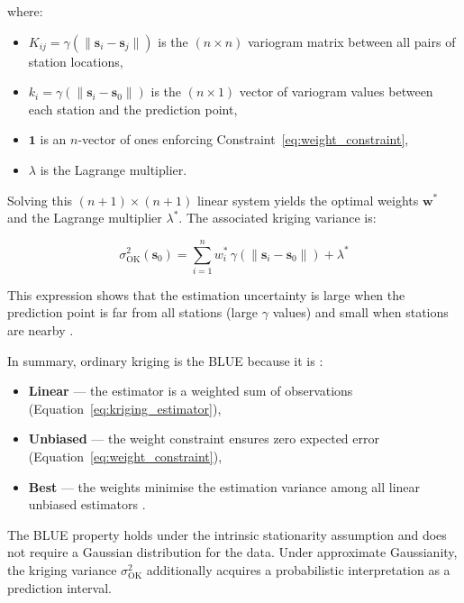 \noindent where:
\begin{itemize}
    \item $K_{ij} = \gamma(\|\mathbf{s}_i - \mathbf{s}_j\|)$ is the
    $(n \times n)$ variogram matrix between all pairs of station locations,
    \item $k_i = \gamma(\|\mathbf{s}_i - \mathbf{s}_0\|)$ is the
    $(n \times 1)$ vector of variogram values between each station and
    the prediction point,
    \item $\mathbf{1}$ is an $n$-vector of ones enforcing
    Constraint~\eqref{eq:weight_constraint},
    \item $\lambda$ is the Lagrange multiplier.
\end{itemize}

Solving this $(n+1) \times (n+1)$ linear system yields the optimal weights
$\mathbf{w}^*$ and the Lagrange multiplier $\lambda^*$.
The associated kriging variance is:

\begin{equation}
    \sigma^2_{\text{OK}}(\mathbf{s}_0)
    = \sum_{i=1}^{n} w_i^* \, \gamma(\|\mathbf{s}_i - \mathbf{s}_0\|)
    + \lambda^*
    \label{eq:kriging_variance}
\end{equation}

\noindent This expression shows that the estimation uncertainty is large when
the prediction point is far from all stations (large $\gamma$ values) and
small when stations are nearby \cite{cressie1993}.

In summary, ordinary kriging is the BLUE because it is
\cite{matheron1963principles, cressie1993, webster2007geostatistics}:
\begin{itemize}
    \item \textbf{Linear} — the estimator is a weighted sum of observations
    (Equation~\eqref{eq:kriging_estimator}),
    \item \textbf{Unbiased} — the weight constraint ensures zero expected error
    (Equation~\eqref{eq:weight_constraint}),
    \item \textbf{Best} — the weights minimise the estimation variance among
    all linear unbiased estimators
    \cite{matheron1963principles, cressie1993}.
\end{itemize}

\noindent The BLUE property holds under the intrinsic stationarity assumption
and does not require a Gaussian distribution for the data.
Under approximate Gaussianity, the kriging variance
$\sigma^2_{\text{OK}}$ additionally acquires a probabilistic interpretation
as a prediction interval.

